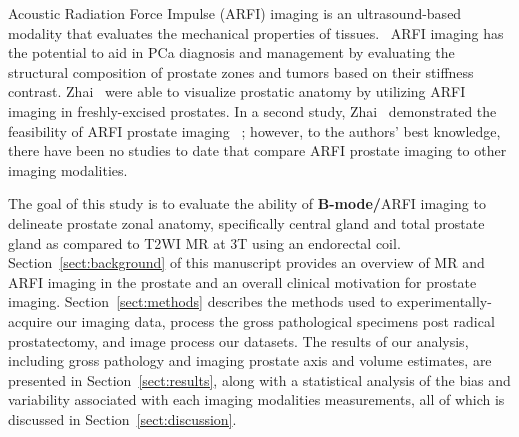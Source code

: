 Acoustic Radiation Force Impulse (ARFI) imaging is an ultrasound-based modality
that evaluates the mechanical properties of tissues.~\cite{Nightingale2002b}
ARFI imaging has the potential to aid in PCa diagnosis and management by
evaluating the structural composition of prostate zones and tumors based on
their stiffness contrast.  Zhai \etal~were able to visualize prostatic anatomy
by utilizing ARFI imaging in freshly-excised prostates. In a second study, Zhai
\etal~demonstrated the feasibility of ARFI prostate imaging
\invivo~\cite{Zhai2012}; however, to the authors’ best knowledge, there have
been no studies to date that compare \invivo ARFI prostate imaging to other
imaging modalities.~\cite{Zhai2010} 

The goal of this study is to evaluate the ability of \textbf{B-mode/}ARFI
imaging to delineate prostate zonal anatomy, specifically central gland and
total prostate gland \invivo as compared to T2WI MR at 3T using an endorectal
coil.   Section~\ref{sect:background} of this
manuscript provides an overview of MR and ARFI imaging in the prostate and an
overall clinical motivation for prostate imaging.  Section~\ref{sect:methods}
describes the methods used to experimentally-acquire our imaging data, process
the gross pathological specimens post radical prostatectomy, and image process
our datasets.  The results of our analysis, including gross pathology and
imaging prostate axis and volume estimates, are presented in
Section~\ref{sect:results}, along with a statistical analysis of the bias and
variability associated with each imaging modalities measurements, all of which
is discussed in Section~\ref{sect:discussion}.

